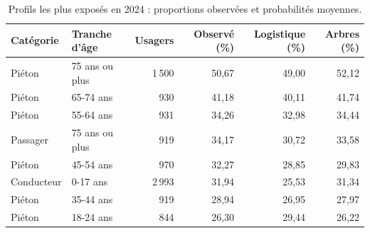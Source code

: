 \begin{table}[htbp]
\centering\small
\renewcommand{\arraystretch}{1.18}
\caption{Profils les plus exposés en 2024 : proportions observées et probabilités moyennes.}\label{tab:ml-profils}
\begin{tabularx}{\textwidth}{@{}LLrrrr@{}}
\toprule
Catégorie & Tranche d'âge & Usagers & Observé (\%) & Logistique (\%) & Arbres (\%) \\
\midrule
Piéton & 75 ans ou plus & 1\,500 & 50,67 & 49,00 & 52,12 \\
Piéton & 65-74 ans & 930 & 41,18 & 40,11 & 41,74 \\
Piéton & 55-64 ans & 931 & 34,26 & 32,98 & 34,44 \\
Passager & 75 ans ou plus & 919 & 34,17 & 30,72 & 33,58 \\
Piéton & 45-54 ans & 970 & 32,27 & 28,85 & 29,83 \\
Conducteur & 0-17 ans & 2\,993 & 31,94 & 25,53 & 31,34 \\
Piéton & 35-44 ans & 919 & 28,94 & 26,95 & 27,97 \\
Piéton & 18-24 ans & 844 & 26,30 & 29,44 & 26,22 \\
\bottomrule
\end{tabularx}
\end{table}
